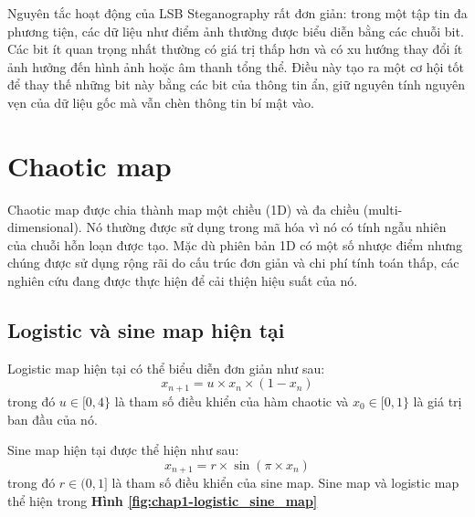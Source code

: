 Nguyên tắc hoạt động của LSB Steganography rất đơn giản: trong một tập tin đa phương tiện, các dữ liệu như điểm ảnh thường được biểu diễn bằng các chuỗi bit. Các bit ít quan trọng nhất thường có giá trị thấp hơn và có xu hướng thay đổi ít ảnh hưởng đến hình ảnh hoặc âm thanh tổng thể. Điều này tạo ra một cơ hội tốt để thay thế những bit này bằng các bit của thông tin ẩn, giữ nguyên tính nguyên vẹn của dữ liệu gốc mà vẫn chèn thông tin bí mật vào.



\section{Chaotic map}
Chaotic map được chia thành map một chiều (1D) và đa chiều  (multi-dimensional). Nó thường được sử dụng trong mã hóa vì nó có tính ngẫu nhiên của chuỗi hỗn loạn được tạo. Mặc dù phiên bản 1D có một số nhược điểm nhưng chúng được sử dụng rộng rãi
do cấu trúc đơn giản và chi phí tính toán thấp, các nghiên cứu đang được thực hiện
để cải thiện hiệu suất của nó.

\subsection{Logistic và sine map hiện tại}

Logistic map hiện tại có thể biểu diễn đơn giản như sau:
\begin{equation}
\label{eq:logistic_map}
    x_{n+1} = u \times x_n \times (1 - x_n)
\end{equation}
trong đó $u \in [0,4\}$ là tham số điều khiển của hàm chaotic và $x_0 \in [0,1\}$ là giá trị ban đầu của nó.

Sine map hiện tại được thể hiện như sau:
\begin{equation}
\label{eq:sine_map}
x_{n + 1} = r \times \sin(\pi \times x_n)
\end{equation}
trong đó $r \in (0,1]$ là tham số điều khiển của sine map. Sine map và logistic map thể hiện trong \textbf{Hình \ref{fig:chap1-logistic_sine_map}}


